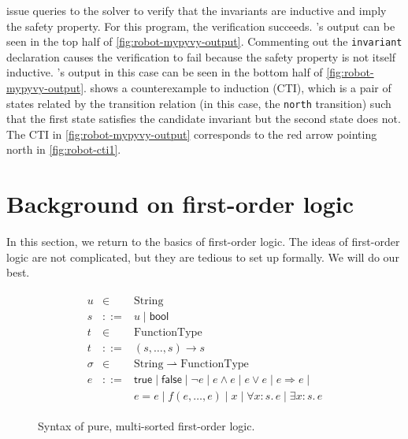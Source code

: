  issue queries to the solver to verify that the invariants
  are inductive and imply the safety property.
For this program, the verification succeeds.
\mypyvy's output can be seen in
  the top half of \cref{fig:robot-mypyvy-output}.
Commenting out the \lstinline[language=mypyvy]{invariant} declaration
  causes the verification to fail
  because the safety property is not itself inductive.
\mypyvy's output in this case can be seen in
  the bottom half of \cref{fig:robot-mypyvy-output}.
\mypyvy shows a counterexample to induction (CTI),
  which is a pair of states related by the transition relation
  (in this case, the \texttt{north} transition)
  such that the first state satisfies the candidate invariant
  but the second state does not.
The CTI in \cref{fig:robot-mypyvy-output} corresponds
  to the red arrow pointing north in \cref{fig:robot-cti1}.

\section{Background on first-order logic}\label{sec:fol-background}

In this section, we return to the basics of first-order logic.
The ideas of first-order logic are not complicated,
  but they are tedious to set up formally.
We will do our best.

\begin{figure}[t]
  \begin{gather*}
  \begin{array}{rcl}
    u &\in& \mathrm{String}\\
    s &::=& u \mid \mathsf{bool}\\
    t &\in& \mathrm{FunctionType}\\
    t &::=& (s,\dots,s) \to s\\
    \sigma &\in&  \mathrm{String} \rightharpoonup \mathrm{FunctionType}\\
    e &::=& \mathsf{true} \mid \mathsf{false} \mid \lnot e\mid e\land e\mid e\lor e \mid e \Rightarrow e \mid \\
      &   & e = e \mid f(e,\dots,e) \mid x \mid \forall x : s.\, e \mid \exists x : s.\, e
  \end{array}
  \end{gather*}
  \caption{Syntax of pure, multi-sorted first-order logic.}
  \label{fig:fol-syntax}
\end{figure}


